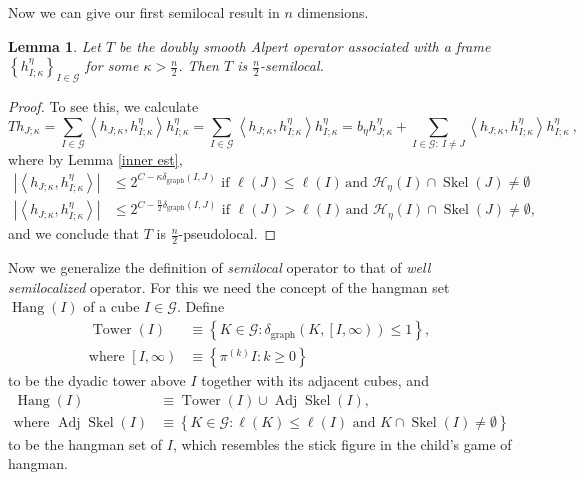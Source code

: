 \documentclass{amsart}%
\theoremstyle{plain}
\newtheorem{lemma}[theorem]{Lemma}
\numberwithin{equation}{section}
\begin{document}
Now we can give our first semilocal result in $n$ dimensions.

\begin{lemma}
Let $T$ be the doubly smooth Alpert operator associated with a frame $\left\{
h_{I;\kappa}^{\eta}\right\}  _{I\in\mathcal{G}}$ for some $\kappa>\frac{n}{2}%
$. Then $T$ is $\frac{n}{2}$-semilocal.
\end{lemma}

\begin{proof}
To see this, we calculate%
\begin{equation}
Th_{J;\kappa}=\sum_{I\in\mathcal{G}}\left\langle h_{J;\kappa},h_{I;\kappa
}^{\eta}\right\rangle h_{I;\kappa}^{\eta}=\sum_{I\in\mathcal{G}}\left\langle
h_{J;\kappa},h_{I;\kappa}^{\eta}\right\rangle h_{I;\kappa}^{\eta}=b_{\eta
}h_{J;\kappa}^{\eta}+\sum_{I\in\mathcal{G}:\ I\neq J}\left\langle h_{J;\kappa
},h_{I;\kappa}^{\eta}\right\rangle h_{I;\kappa}^{\eta}\ ,\label{ident semi}%
\end{equation}
where by Lemma \ref{inner est},%
\begin{align}
\left\vert \left\langle h_{J;\kappa},h_{I;\kappa}^{\eta}\right\rangle
\right\vert  & \leq2^{C-\kappa\delta_{\operatorname*{graph}}\left(
I,J\right)  }\text{ if }\ell\left(  J\right)  \leq\ell\left(  I\right)
\,\text{and }\mathcal{H}_{\eta}\left(  I\right)  \cap\operatorname*{Skel}%
\left(  J\right)  \neq\emptyset\label{where' semi}\\
\left\vert \left\langle h_{J;\kappa},h_{I;\kappa}^{\eta}\right\rangle
\right\vert  & \leq2^{C-\frac{n}{2}\delta_{\operatorname*{graph}}\left(
I,J\right)  }\text{ if }\ell\left(  J\right)  >\ell\left(  I\right)
\,\text{and }\mathcal{H}_{\eta}\left(  I\right)  \cap\operatorname*{Skel}%
\left(  J\right)  \neq\emptyset,\nonumber
\end{align}
and we conclude that $T$ is $\frac{n}{2}$-pseudolocal.
\end{proof}

Now we generalize the definition of \emph{semilocal} operator to that of
\emph{well semilocalized} operator. For this we need the concept of the
hangman set $\operatorname*{Hang}\left(  I\right)  $ of a cube $I\in
\mathcal{G}$. Define
\begin{align*}
\operatorname*{Tower}\left(  I\right)    & \equiv\left\{  K\in\mathcal{G}%
:\delta_{\operatorname*{graph}}\left(  K,\left[  I,\infty\right)  \right)
\leq1\right\}  ,\\
\text{where }\left[  I,\infty\right)    & \equiv\left\{  \pi^{\left(
k\right)  }I:k\geq0\right\}
\end{align*}
to be the dyadic tower above $I$ together with its adjacent cubes, and
\begin{align*}
\operatorname*{Hang}\left(  I\right)    & \equiv\operatorname*{Tower}\left(
I\right)  \cup\operatorname*{Adj}\operatorname*{Skel}\left(  I\right)  ,\\
\text{where }\operatorname*{Adj}\operatorname*{Skel}\left(  I\right)    &
\equiv\left\{  K\in\mathcal{G}:\ell\left(  K\right)  \leq\ell\left(  I\right)
\text{ and }K\cap\operatorname*{Skel}\left(  I\right)  \neq\emptyset\right\}
\end{align*}
to be the hangman set of $I$, which resembles the stick figure in the child's
game of hangman.
\end{document}
